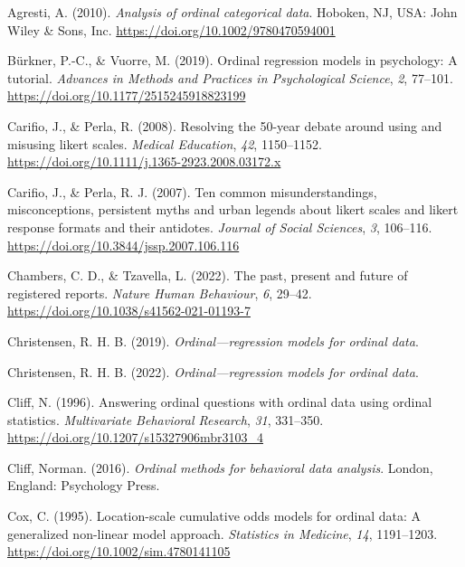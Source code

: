 \documentclass[
  man,floatsintext]{apa6}
\newlength{\cslhangindent}
\newenvironment{CSLReferences}[2] %
 {\begin{list}{}{%
  \setlength{\itemindent}{0pt}
  \setlength{\leftmargin}{0pt}
  \setlength{\parsep}{0pt}
  \ifodd #1
   \setlength{\leftmargin}{\cslhangindent}
   \setlength{\itemindent}{-1\cslhangindent}
  \fi
  \setlength{\itemsep}{#2\baselineskip}}}
 {\end{list}}
\begin{document}
\label{refs}
\begin{CSLReferences}{1}{0}
Agresti, A. (2010). \emph{Analysis of ordinal categorical data}. Hoboken, NJ, USA: John Wiley \& Sons, Inc. \url{https://doi.org/10.1002/9780470594001}

Bürkner, P.-C., \& Vuorre, M. (2019). Ordinal regression models in psychology: A tutorial. \emph{Advances in Methods and Practices in Psychological Science}, \emph{2}, 77--101. \url{https://doi.org/10.1177/2515245918823199}

Carifio, J., \& Perla, R. (2008). Resolving the 50-year debate around using and misusing likert scales. \emph{Medical Education}, \emph{42}, 1150--1152. \url{https://doi.org/10.1111/j.1365-2923.2008.03172.x}

Carifio, J., \& Perla, R. J. (2007). Ten common misunderstandings, misconceptions, persistent myths and urban legends about likert scales and likert response formats and their antidotes. \emph{Journal of Social Sciences}, \emph{3}, 106--116. \url{https://doi.org/10.3844/jssp.2007.106.116}

Chambers, C. D., \& Tzavella, L. (2022). The past, present and future of registered reports. \emph{Nature Human Behaviour}, \emph{6}, 29--42. \url{https://doi.org/10.1038/s41562-021-01193-7}

Christensen, R. H. B. (2019). \emph{Ordinal---regression models for ordinal data}.

Christensen, R. H. B. (2022). \emph{Ordinal---regression models for ordinal data}.

Cliff, N. (1996). Answering ordinal questions with ordinal data using ordinal statistics. \emph{Multivariate Behavioral Research}, \emph{31}, 331--350. \url{https://doi.org/10.1207/s15327906mbr3103_4}

Cliff, Norman. (2016). \emph{Ordinal methods for behavioral data analysis}. London, England: Psychology Press.

Cox, C. (1995). Location-scale cumulative odds models for ordinal data: A generalized non-linear model approach. \emph{Statistics in Medicine}, \emph{14}, 1191--1203. \url{https://doi.org/10.1002/sim.4780141105}


\end{CSLReferences}
\end{document}

